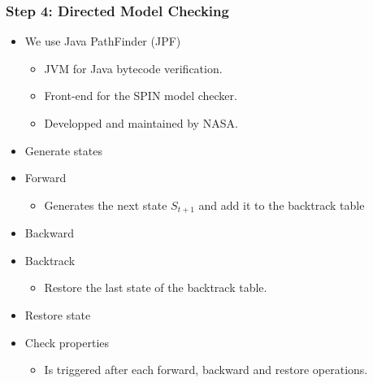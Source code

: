 \documentclass{beamer}
\begin{document}
\begin{frame}
\frametitle{Step 4: Directed Model Checking}

\begin{itemize}

\item We use Java PathFinder (JPF)
\begin{itemize}
\item JVM for Java bytecode verification.
\item Front-end for the SPIN model checker.
\item Developped and maintained by NASA.
\end{itemize}



\item Generate states
\item Forward

\begin{itemize}
\item Generates the next state $S_{t+1}$ and add it to the backtrack table
\end{itemize}

\item Backward

\item Backtrack
\begin{itemize}
\item Restore the last state of the backtrack table.
\end{itemize}

\item Restore state

\item Check properties

\begin{itemize}
\item Is triggered after each forward, backward and restore operations.
\end{itemize}


\end{itemize}

\end{frame}
\end{document}
